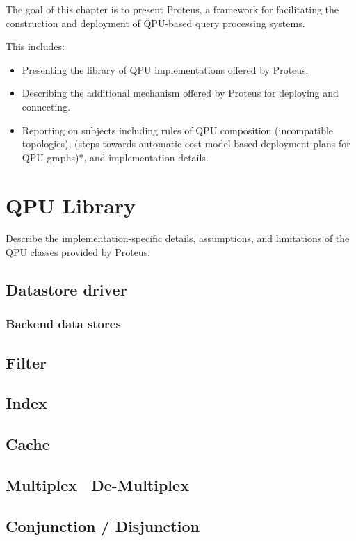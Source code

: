 The goal of this chapter is to present Proteus, a framework for facilitating
the construction and deployment of QPU-based query processing systems.

This includes:
\begin{itemize}
  \item Presenting the library of QPU implementations offered by Proteus.
  \item Describing the additional mechanism offered by Proteus for deploying and
  connecting.
  \item Reporting on subjects including rules of QPU composition (incompatible
  topologies), (steps towards automatic cost-model based deployment plans for
  QPU graphs)*, and implementation details.
\end{itemize}

\section{QPU Library}
Describe the implementation-specific details, assumptions, and limitations of
the QPU classes provided by Proteus.

\subsection{Datastore driver}
\subsubsection{Backend data stores}

\subsection{Filter}

\subsection{Index}

\subsection{Cache}

\subsection{Multiplex \ De-Multiplex}

\subsection{Conjunction / Disjunction}


